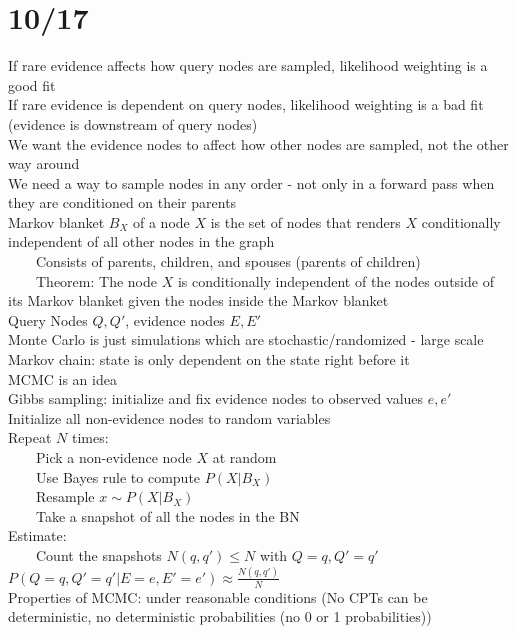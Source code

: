 \documentclass[10pt,letterpaper,unboxed,cm]{article}
\newcommand{\tab}{~~~~}
\begin{document}
\section{10/17}
If rare evidence affects how query nodes are sampled, likelihood weighting is a good fit\\
If rare evidence is dependent on query nodes, likelihood weighting is a bad fit (evidence is downstream of query nodes)\\ 
We want the evidence nodes to affect how other nodes are sampled, not the other way around\\
We need a way to sample nodes in any order - not only in a forward pass when they are conditioned on their parents\\
Markov blanket $B_X$ of a node $X$ is the set of nodes that renders $X$ conditionally independent of all other nodes in the graph\\
\tab Consists of parents, children, and spouses (parents of children)\\
\tab Theorem: The node $X$ is conditionally independent of the nodes outside of its Markov blanket given the nodes inside the Markov blanket\\
Query Nodes $Q, Q'$, evidence nodes $E, E'$\\
Monte Carlo is just simulations which are stochastic/randomized - large scale\\
Markov chain: state is only dependent on the state right before it\\
MCMC is an idea\\
Gibbs sampling: initialize and fix evidence nodes to observed values $e, e'$\\
Initialize all non-evidence nodes to random variables\\
Repeat $N$ times: \\
\tab Pick a non-evidence node $X$ at random\\
\tab Use Bayes rule to compute $P(X|B_X)$\\
\tab Resample $x \sim P(X|B_X)$\\
\tab Take a snapshot of all the nodes in the BN\\
Estimate: \\
\tab Count the snapshots $N(q,q') \leq N$ with $Q = q, Q' = q'$\\
$P(Q = q, Q' = q'|E = e, E' = e') \approx \frac{N(q,q')}{N}$\\
Properties of MCMC: under reasonable conditions (No CPTs can be deterministic, no deterministic probabilities (no 0 or 1 probabilities))\\
\end{document}
